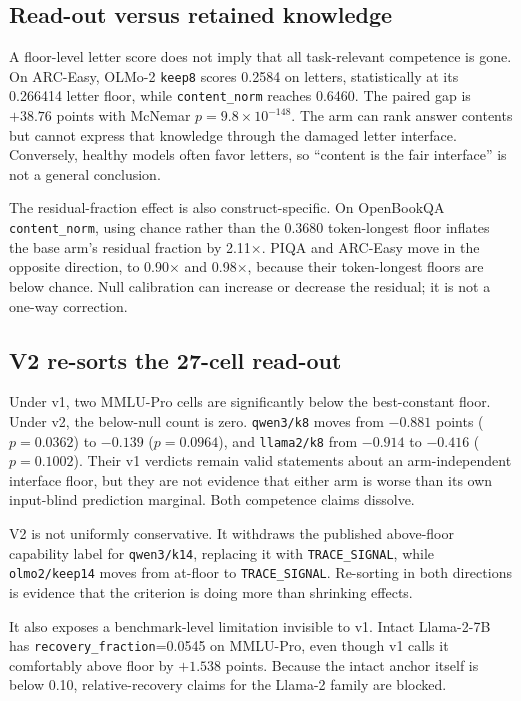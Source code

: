 \subsection{Read-out versus retained knowledge}

A floor-level letter score does not imply that all task-relevant competence is gone. On ARC-Easy, OLMo-2 \texttt{keep8} scores 0.2584 on letters, statistically at its 0.266414 letter floor, while \texttt{content\_norm} reaches 0.6460. The paired gap is $+38.76$ points with McNemar $p=9.8\times10^{-148}$. The arm can rank answer contents but cannot express that knowledge through the damaged letter interface. Conversely, healthy models often favor letters, so ``content is the fair interface'' is not a general conclusion.

The residual-fraction effect is also construct-specific. On OpenBookQA \texttt{content\_norm}, using chance rather than the 0.3680 token-longest floor inflates the base arm's residual fraction by 2.11$\times$. PIQA and ARC-Easy move in the opposite direction, to 0.90$\times$ and 0.98$\times$, because their token-longest floors are below chance. Null calibration can increase or decrease the residual; it is not a one-way correction.

\subsection{V2 re-sorts the 27-cell read-out}

Under v1, two MMLU-Pro cells are significantly below the best-constant floor. Under v2, the below-null count is zero. \texttt{qwen3/k8} moves from $-0.881$ points ($p=0.0362$) to $-0.139$ ($p=0.0964$), and \texttt{llama2/k8} from $-0.914$ to $-0.416$ ($p=0.1002$). Their v1 verdicts remain valid statements about an arm-independent interface floor, but they are not evidence that either arm is worse than its own input-blind prediction marginal. Both competence claims dissolve.

V2 is not uniformly conservative. It withdraws the published above-floor capability label for \texttt{qwen3/k14}, replacing it with \texttt{TRACE\_SIGNAL}, while \texttt{olmo2/keep14} moves from at-floor to \texttt{TRACE\_SIGNAL}. Re-sorting in both directions is evidence that the criterion is doing more than shrinking effects.

It also exposes a benchmark-level limitation invisible to v1. Intact Llama-2-7B has \texttt{recovery\_fraction}=0.0545 on MMLU-Pro, even though v1 calls it comfortably above floor by $+1.538$ points. Because the intact anchor itself is below 0.10, relative-recovery claims for the Llama-2 family are blocked.

